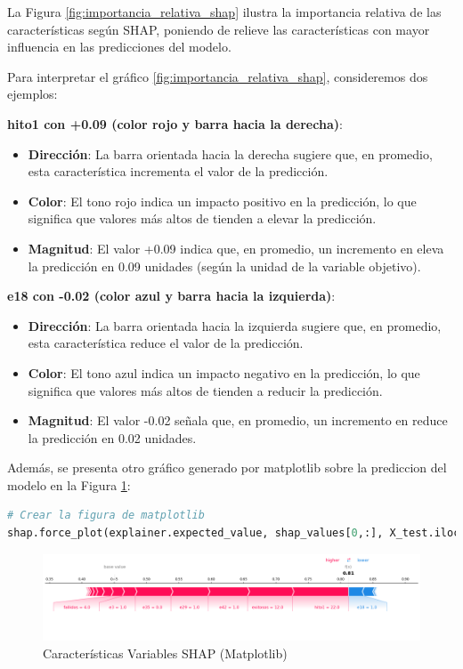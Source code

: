 La Figura \ref{fig:importancia_relativa_shap} ilustra la importancia relativa de las características según SHAP, poniendo de relieve las características con mayor influencia en las predicciones del modelo.

Para interpretar el gráfico \ref{fig:importancia_relativa_shap}, consideremos dos ejemplos:

\textbf{hito1 con +0.09 (color rojo y barra hacia la derecha)}:
\begin{itemize}
    \item \textbf{Dirección}: La barra orientada hacia la derecha sugiere que, en promedio, esta característica incrementa el valor de la predicción.
    \item \textbf{Color}: El tono rojo indica un impacto positivo en la predicción, lo que significa que valores más altos de  tienden a elevar la predicción.
    \item \textbf{Magnitud}: El valor +0.09 indica que, en promedio, un incremento en  eleva la predicción en 0.09 unidades (según la unidad de la variable objetivo).
\end{itemize}


\textbf{e18 con -0.02 (color azul y barra hacia la izquierda)}:
\begin{itemize}
    \item \textbf{Dirección}: La barra orientada hacia la izquierda sugiere que, en promedio, esta característica reduce el valor de la predicción.
    \item \textbf{Color}: El tono azul indica un impacto negativo en la predicción, lo que significa que valores más altos de  tienden a reducir la predicción.
    \item \textbf{Magnitud}: El valor -0.02 señala que, en promedio, un incremento en  reduce la predicción en 0.02 unidades.
\end{itemize}


Además, se presenta otro gráfico generado por matplotlib sobre la prediccion del modelo en la Figura \ref{fig:caract_var_shap_mat}:

\begin{lstlisting}[language=Python, caption=grafico matplotib, label=lst:graf_matplotib]
# Crear la figura de matplotlib
shap.force_plot(explainer.expected_value, shap_values[0,:], X_test.iloc[0,:], matplotlib=True)
\end{lstlisting}

\begin{figure}[ht]
    \centering
    \includegraphics[width=1\textwidth]{img/shap_rf/shapForcePlot.png}
    \caption{Características Variables SHAP (Matplotlib)}
    \label{fig:caract_var_shap_mat}
\end{figure}

